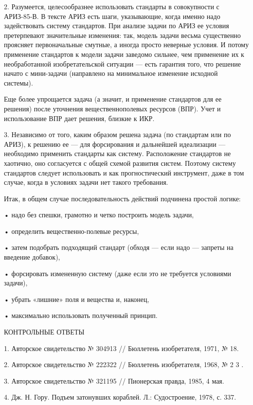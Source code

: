 2. Разумеется, целесообразнее использовать  стандарты в совокупности с
АРИЗ-85-В. В  тексте АРИЗ  есть шаги,  указывающие, когда  именно надо
задействовать  систему  стандартов.  При  анализе задачи  по  АРИЗ  ее
условия претерпевают значительные изменения: так, модель задачи весьма
существенно проясняет первоначальные смутные, а иногда просто неверные
условия.  И  потому применение  стандартов  к  модели задачи  заведомо
сильнее, чем применение их  к необработанной изобретательской ситуации
— есть гарантия того, что  решение начато с мини-задачи (направлено на
минимальное изменение исходной системы).

Еще более упрощается задача (а  значит, и применение стандартов для ее
решения)  после уточнения  вещественнополевых ресурсов  (ВПР). Учет  и
использование ВПР дает решения, близкие к ИКР.

3. Независимо от того, каким  образом решена задача (по стандартам или
по АРИЗ), к  решению ее — для форсирования и  дальнейшей идеализации —
необходимо  применить стандарты  как систему.  Расположение стандартов
не  хаотично,   оно  согласуется  с  общей   схемой  развития  систем.
Поэтому систему стандартов следует  использовать и как прогностический
инструмент,  даже в  том случае,  когда в  условиях задачи  нет такого
требования.

Итак,  в общем  случае последовательность  действий подчинена  простой
логике:

• надо без спешки, грамотно и четко построить модель задачи,

• определить вещественно-полевые ресурсы,

• затем подобрать подходящий стандарт (обходя — если надо — запреты на
введение добавок),

• форсировать измененную систему (даже если это не требуется условиями
задачи),

• убрать «лишние» поля и вещества и, наконец,

• максимально использовать полученный принцип.


КОНТРОЛЬНЫЕ ОТВЕТЫ

1. Авторское свидетельство № 304913 // Бюллетень изобретателя, 1971, № 18.

2. Авторское свидетельство № 222322 // Бюллетень изобретателя, 1968, № 2 3 .

3. Авторское свидетельство № 321195 // Пионерская правда,
1985, 4 мая.

4. Дж. Н. Гору. Подъем затонувших кораблей. Л.: Судостроение,
1978, с. 337.

